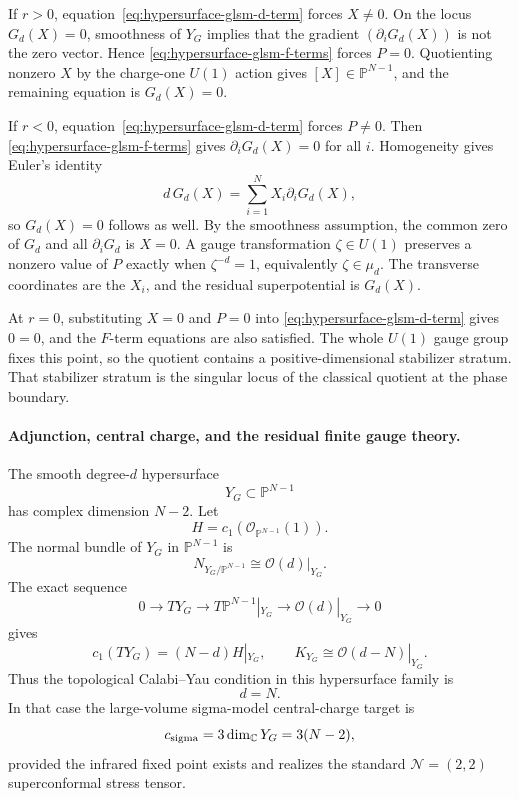 If \(r>0\), equation~\eqref{eq:hypersurface-glsm-d-term} forces
\(X\neq0\).  On the locus \(G_d(X)=0\), smoothness of \(Y_G\) implies that
the gradient \((\partial_iG_d(X))\) is not the zero vector.  Hence
\eqref{eq:hypersurface-glsm-f-terms} forces \(P=0\).  Quotienting nonzero
\(X\) by the charge-one \(U(1)\) action gives \([X]\in\mathbb P^{N-1}\), and
the remaining equation is \(G_d(X)=0\).

If \(r<0\), equation~\eqref{eq:hypersurface-glsm-d-term} forces \(P\neq0\).
Then \eqref{eq:hypersurface-glsm-f-terms} gives
\(\partial_iG_d(X)=0\) for all \(i\).  Homogeneity gives Euler's identity
\[
  d\,G_d(X)=\sum_{i=1}^N X_i\partial_iG_d(X),
\]
so \(G_d(X)=0\) follows as well.  By the smoothness assumption, the common
zero of \(G_d\) and all \(\partial_iG_d\) is \(X=0\).  A gauge
transformation \(\zeta\in U(1)\) preserves a nonzero value of \(P\) exactly
when \(\zeta^{-d}=1\), equivalently \(\zeta\in\mu_d\).  The transverse
coordinates are the \(X_i\), and the residual superpotential is \(G_d(X)\).

At \(r=0\), substituting \(X=0\) and \(P=0\) into
\eqref{eq:hypersurface-glsm-d-term} gives \(0=0\), and the \(F\)-term
equations are also satisfied.  The whole \(U(1)\) gauge group fixes this
point, so the quotient contains a positive-dimensional stabilizer stratum.
That stabilizer stratum is the singular locus of the classical quotient at
the phase boundary.

\paragraph{Adjunction, central charge, and the residual finite gauge theory.}
The smooth degree-\(d\) hypersurface
\[
  Y_G\subset\mathbb P^{N-1}
\]
has complex dimension \(N-2\).  Let
\[
  H=c_1(\mathcal O_{\mathbb P^{N-1}}(1)).
\]
The normal bundle of \(Y_G\) in \(\mathbb P^{N-1}\) is
\[
  N_{Y_G/\mathbb P^{N-1}}\cong \mathcal O(d)|_{Y_G}.
\]
The exact sequence
\[
  0\longrightarrow TY_G
  \longrightarrow T\mathbb P^{N-1}|_{Y_G}
  \longrightarrow \mathcal O(d)|_{Y_G}
  \longrightarrow0
\]
gives
\begin{equation}
  c_1(TY_G)=(N-d)H|_{Y_G},
  \qquad
  K_{Y_G}\cong \mathcal O(d-N)|_{Y_G}.
  \label{eq:hypersurface-adjunction-c1}
\end{equation}
Thus the topological Calabi--Yau condition in this hypersurface family is
\[
  d=N .
\]
In that case the large-volume sigma-model central-charge target is
\begin{equation}
  c_{\rm sigma}=3\dim_{\mathbb C}Y_G=3(N-2),
  \label{eq:hypersurface-sigma-central-charge-target}
\end{equation}
provided the infrared fixed point exists and realizes the standard
\(\mathcal N=(2,2)\) superconformal stress tensor.

